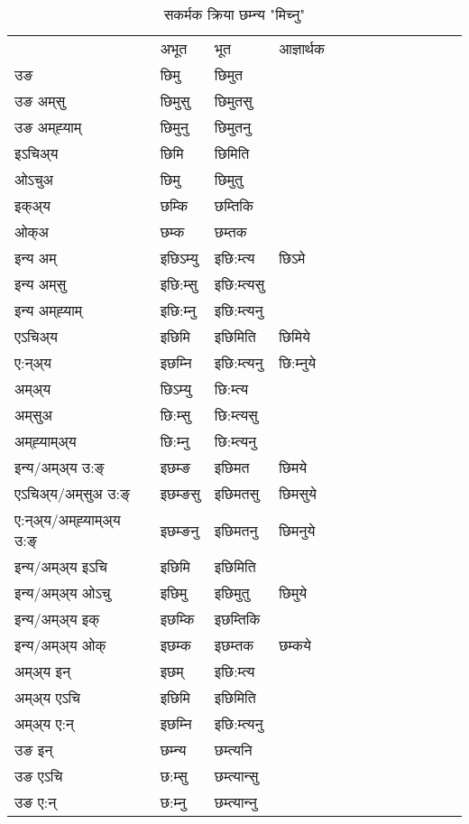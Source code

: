 \begin{table}[H]
\centering
\caption{\label{im.vt} सकर्मक क्रिया  छम्‍न्य  "मिच्नु"  }
\begin{tabular}{l|l|l|l|l|l|l|l|l|l|l|l|l}  \toprule
&अभूत & भूत & आज्ञार्थक \\ 
उङ &छिमु &छिमुत \\ 
उङ अम्‌सु &छिमुसु &छिमुतसु \\ 
उङ अम्‌ह्‍याम् &छिमुनु &छिमुतनु \\ 
इऽचिअ्य &छिमि &छिमिति   \\ 
ओऽचुअ &छिमु &छिमुतु   \\ 
इक्अ्य &छम्कि &छम्तिकि   \\ 
ओक्अ &छम्क &छम्तक   \\ 
इन्य अम् & इछिऽम्यु  & इछि:म्त्य &छिऽमे  \\ 
इन्य अम्‌सु & इछि:म्सु  & इछि:म्त्यसु   \\ 
इन्य अम्‌ह्‍याम् & इछि:म्‍नु  & इछि:म्त्यनु   \\ 
एऽचिअ्य & इछिमि & इछिमिति &छिमिये    \\ 
ए:न्अ्य & इछम्‍नि  & इछि:म्त्यनु &छि:म्‍नुये  \\ 
अम्अ्य & छिऽम्यु  & छि:म्त्य  \\ 
अम्‌सुअ & छि:म्सु & छि:म्त्यसु  \\ 
अम्‌ह्‍याम्अ्य & छि:म्‍नु  & छि:म्त्यनु \\ 
\midrule
इन्य/अम्अ्य उ:ङ्‌&इछम्ङ & इछिमत &छिमये \\ 
एऽचिअ्य/अम्‌सुअ उ:ङ्‌ &इछम्ङसु & इछिमतसु &छिमसुये \\ 
ए:न्अ्य/अम्‌ह्‍याम्अ्य उ:ङ्‌ &इछम्ङनु & इछिमतनु &छिमनुये \\ 
इन्य/अम्अ्य इऽचि & इछिमि & इछिमिति    \\ 
इन्य/अम्अ्य ओऽचु & इछिमु & इछिमुतु  &छिमुये  \\ 
इन्य/अम्अ्य इक् & इछम्कि & इछम्तिकि   \\ 
इन्य/अम्अ्य ओक् & इछम्क & इछम्तक  &छम्कये  \\ 
अम्अ्य इन् & इछम् & इछि:म्त्य   \\ 
अम्अ्य एऽचि & इछिमि & इछिमिति    \\ 
अम्अ्य ए:न् & इछम्‍नि  & इछि:म्त्यनु  \\ 
\midrule
उङ इन् & छम्‍न्य  & छम्त्यनि  \\ 
उङ एऽचि & छ:म्सु  & छम्त्यान्सु   \\ 
उङ ए:न्& छ:म्‍नु  & छम्त्यान्‍नु   \\ 
\bottomrule
\end{tabular}
\end{table}


